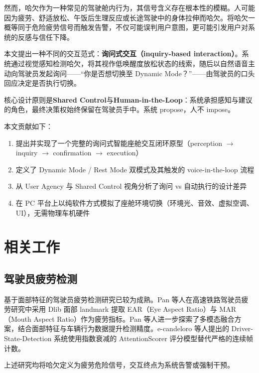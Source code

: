 \documentclass[12pt,a4paper]{ctexart}
\begin{document}
然而，哈欠作为一种常见的驾驶舱内行为，其信号含义存在根本性的模糊。人可能因为疲劳、舒适放松、午饭后生理反应或长途驾驶中的身体拉伸而哈欠。将哈欠一概等同于危险疲劳信号而触发告警，不仅可能误判用户意图，更可能引发用户对系统的反感与信任下降。

本文提出一种不同的交互范式：\textbf{询问式交互（inquiry-based interaction）}。系统通过视觉感知检测哈欠，将其视作低唤醒度放松状态的线索，随后以自然语音主动向驾驶员发起询问——“你是否想切换至 Dynamic Mode？”——由驾驶员的口头回应决定是否执行切换。

核心设计原则是\textbf{Shared Control}与\textbf{Human-in-the-Loop}：系统承担感知与建议的角色，最终决策权始终保留在驾驶员手中。系统 propose，人不 impose。

本文贡献如下：
\begin{enumerate}[label=\arabic*.]
    \item 提出并实现了一个完整的询问式智能座舱交互闭环原型（perception $\rightarrow$ inquiry $\rightarrow$ confirmation $\rightarrow$ execution）
    \item 定义了 Dynamic Mode / Rest Mode 双模式及其触发的 voice-in-the-loop 流程
    \item 从 User Agency 与 Shared Control 视角分析了询问 vs 自动执行的设计差异
    \item 在 PC 平台上以纯软件方式模拟了座舱环境切换（环境光、音效、虚拟空调、UI），无需物理车机硬件
\end{enumerate}

\section{相关工作}

\subsection{驾驶员疲劳检测}

基于面部特征的驾驶员疲劳检测研究已较为成熟。Pan 等人在高速铁路驾驶员疲劳研究中采用 Dlib 面部 landmark 提取 EAR（Eye Aspect Ratio）与 MAR（Mouth Aspect Ratio）作为疲劳指标\cite{pan_highspeed}。Pan 等人进一步探索了多模态融合方案，结合面部特征与车辆行为数据提升检测精度\cite{pan_multimodal}。e-candeloro 等人提出的 Driver-State-Detection 系统使用指数衰减的 AttentionScorer 评分模型替代严格的连续帧计数\cite{candeloro}。

上述研究均将哈欠定义为疲劳危险信号，交互终点为系统告警或强制干预。
\end{document}
